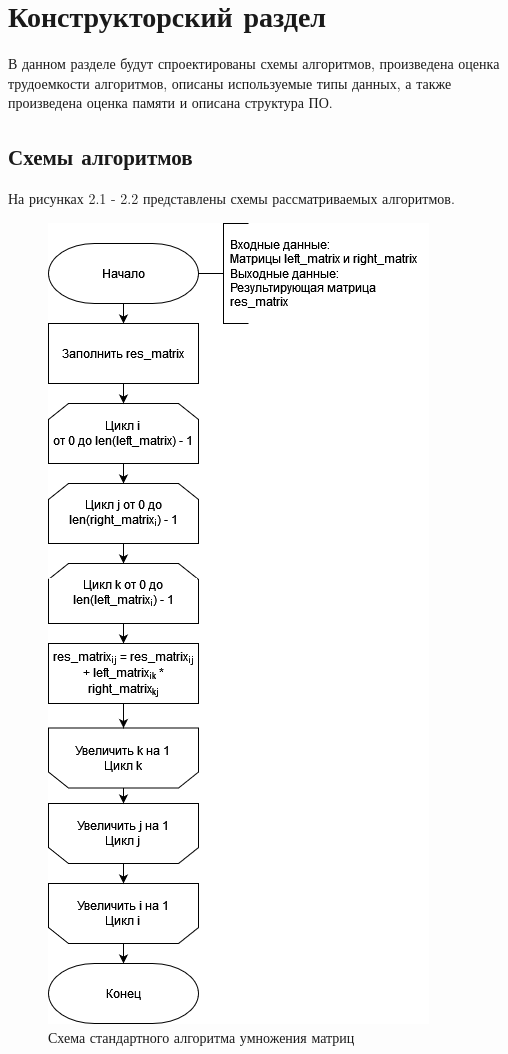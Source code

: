 \chapter{Конструкторский раздел}

В данном разделе будут спроектированы схемы алгоритмов, произведена оценка трудоемкости алгоритмов, описаны используемые типы данных, а также произведена оценка памяти и описана структура ПО.

\section{Схемы алгоритмов}

На рисунках 2.1 - 2.2 представлены схемы рассматриваемых алгоритмов.
 
\newpage
\begin{figure}[h!]
	\begin{center}
		\includegraphics[scale=0.6]{assets/multStand.png}
	\end{center}
	\caption{Схема стандартного алгоритма умножения матриц}
\end{figure}

